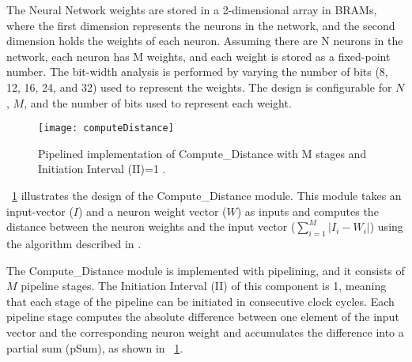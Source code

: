 The Neural Network weights are stored in a 2-dimensional array in BRAMs, where the first dimension represents the neurons in the network, and the second dimension holds the weights of each neuron. Assuming there are N neurons in the network, each neuron has M weights, and each weight is stored as a fixed-point number. The bit-width analysis is performed by varying the number of bits (8, 12, 16, 24, and 32) used to represent the weights. The design is configurable for $N$, $M$, and the number of bits used to represent each weight.
\begin{figure}[!htb]
	\centering
	\texttt{[image: computeDistance]}
	\caption{Pipelined implementation of Compute\_Distance with M stages and Initiation Interval (II)=1 .}
	\label{fig:ComputeDistance}
\end{figure}
\begin{comment}
\figurename{~\ref{fig:ComputeDistance}} shows the design of the Compute\_Distance module. This component takes an input-vector ($I$) and a neuron weight vector ($W$) as input and returns the distance between neuron weights and the input vector ($\sum_{i=1}^{M}|I_{i}-W_{i}|$) as described in Algorithm~\ref{alg:algorithm}. This component has a pipelined implementation with $M$ number of pipeline stages. The initiation Interval (II) of this component is 1. Each stage of the pipeline computes the absolute difference between one input element and the corresponding neuron weight and accumlates the difference into the partial sum (pSum) as shown in \figurename{~\ref{fig:ComputeDistance}}. The accumlated pSum is then passed as input to the next stage. The pSum to the first stage is set to zero. The pSum of the last stage is the distance between the input and neuron vectors.
\end{comment}

\figurename{~\ref{fig:ComputeDistance}} illustrates the design of the Compute\_Distance module. This module takes an input-vector ($I$) and a neuron weight vector ($W$) as inputs and computes the distance between the neuron weights and the input vector ($\sum_{i=1}^{M}|I_{i}-W_{i}|$) using the algorithm described in . 

The Compute\_Distance module is implemented with pipelining, and it consists of $M$ pipeline stages. The Initiation Interval (II) of this component is 1, meaning that each stage of the pipeline can be initiated in consecutive clock cycles. Each pipeline stage computes the absolute difference between one element of the input vector and the corresponding neuron weight and accumulates the difference into a partial sum (pSum), as shown in \figurename{~\ref{fig:ComputeDistance}}.

